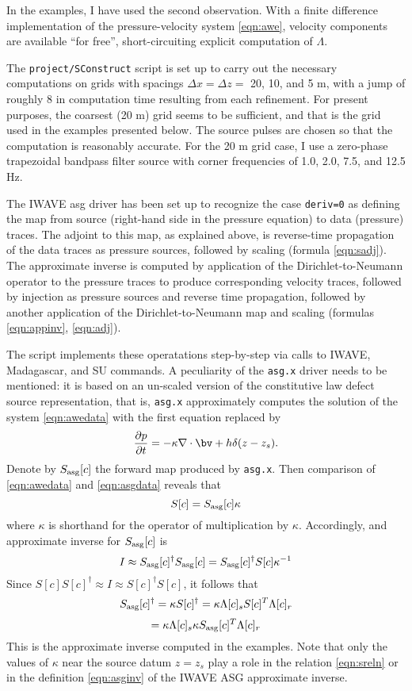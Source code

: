 In the examples, I have used the second observation. With a finite difference implementation of the pressure-velocity system \ref{eqn:awe}, velocity components are available ``for free'', short-circuiting explicit computation of $\Lambda$.

The  {\tt project/SConstruct} script is set up to carry out the necessary computations on grids with spacings $\Delta x = \Delta z = $ 20, 10, and 5 m, with a jump of roughly 8 in computation time resulting from each refinement. For present purposes, the coarsest (20 m) grid seems to be sufficient, and that is the grid used in the examples presented below. The source pulses are chosen so that the computation is reasonably accurate. For the 20 m grid case, I use a zero-phase trapezoidal bandpass filter source with corner frequencies of 1.0, 2.0, 7.5, and 12.5 Hz.

The IWAVE asg driver has been set up to recognize the case {\tt deriv=0} as defining the map from source (right-hand side in the pressure equation) to data (pressure) traces. The adjoint to this map, as explained above, is reverse-time propagation of the data traces as pressure sources, followed by scaling (formula \ref{eqn:sadj}). The approximate inverse is computed by application of the Dirichlet-to-Neumann operator to the pressure traces to produce corresponding velocity traces, followed by injection as pressure sources and reverse time propagation, followed by another application of the Dirichlet-to-Neumann map and scaling (formulas \ref{eqn:appinv}, \ref{eqn:adj}).

The script implements these operatations step-by-step via calls to IWAVE, Madagascar, and SU commands. A peculiarity of the {\tt asg.x} driver needs to be mentioned: it is based on an un-scaled version of the constitutive law defect source representation, that is, {\tt asg.x} approximately computes the solution of the system \ref{eqn:awedata} with the first equation replaced by
\begin{equation}
\label{eqn:asgdata}
\frac{\partial p}{\partial t}  =  - \kappa \nabla \cdot \bv +
h \delta(z-z_s).
\end{equation}
Denote by $S_{\rm asg}[c]$ the forward map produced by {\tt asg.x}. Then comparison of \ref{eqn:awedata} and \ref{eqn:asgdata} reveals that
\begin{equation}
\label{eqn:sreln}
S[c]=S_{\rm asg}[c]\kappa
\end{equation}
where $\kappa$ is shorthand for the operator of multiplication by $\kappa$. Accordingly, and approximate inverse for $S_{\rm asg}[c]$ is
\[
I \approx S_{\rm asg}[c]^{\dagger}S_{\rm asg}[c] = S_{\rm asg}[c]^{\dagger}S[c]\kappa^{-1}
\]
Since $S[c]S[c]^{\dagger} \approx I \approx S[c]^{\dagger}S[c]$, it follows that
\[
S_{\rm asg}[c]^{\dagger}=\kappa S[c]^{\dagger} = \kappa\Lambda[c]_s S[c]^T \Lambda[c]_r 
\]
\begin{equation}
\label{eqn:asginv}
= \kappa \Lambda[c]_s \kappa S_{\rm asg}[c]^T\Lambda[c]_r
\end{equation}
This is the approximate inverse computed in the examples. Note that
only the values of $\kappa$ near the source datum $z=z_s$ play a role
in the relation \ref{eqn:sreln} or in the definition \ref{eqn:asginv}
of the IWAVE ASG approximate inverse.

